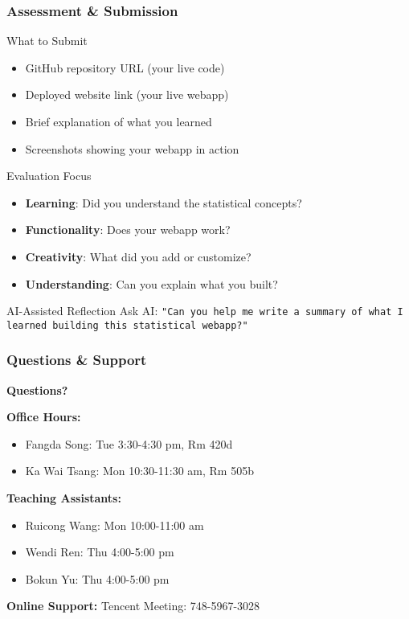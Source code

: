 \documentclass[aspectratio=169]{beamer}
\begin{document}
\begin{frame}
\frametitle{Assessment \& Submission}
\begin{alertblock}{What to Submit}
\begin{itemize}
\item GitHub repository URL (your live code)
\item Deployed website link (your live webapp)
\item Brief explanation of what you learned
\item Screenshots showing your webapp in action
\end{itemize}
\end{alertblock}

\begin{exampleblock}{Evaluation Focus}
\begin{itemize}
\item \textbf{Learning}: Did you understand the statistical concepts?
\item \textbf{Functionality}: Does your webapp work?
\item \textbf{Creativity}: What did you add or customize?
\item \textbf{Understanding}: Can you explain what you built?
\end{itemize}
\end{exampleblock}

\begin{alertblock}{AI-Assisted Reflection}
Ask AI: \texttt{"Can you help me write a summary of what I learned building this statistical webapp?"}
\end{alertblock}
\end{frame}

\begin{frame}
\frametitle{Questions \& Support}
\begin{center}
\Large \textbf{Questions?}

\vspace{1em}

\textbf{Office Hours:}
\begin{itemize}
\item Fangda Song: Tue 3:30-4:30 pm, Rm 420d
\item Ka Wai Tsang: Mon 10:30-11:30 am, Rm 505b
\end{itemize}

\vspace{1em}

\textbf{Teaching Assistants:}
\begin{itemize}
\item Ruicong Wang: Mon 10:00-11:00 am
\item Wendi Ren: Thu 4:00-5:00 pm
\item Bokun Yu: Thu 4:00-5:00 pm
\end{itemize}

\vspace{1em}

\textbf{Online Support:}
Tencent Meeting: 748-5967-3028
\end{center}
\end{frame}
\end{document}
